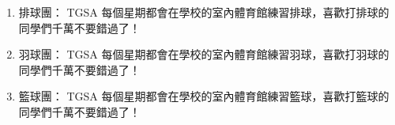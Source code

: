 \documentclass[10pt,a4paper]{book}
\begin{document}
\begin{CJK}{UTF8}{bkai}
\begin{enumerate}
\item{排球團：}
TGSA 每個星期都會在學校的室內體育館練習排球，喜歡打排球的同學們千萬不要錯過了！

\item{羽球團：}
TGSA 每個星期都會在學校的室內體育館練習羽球，喜歡打羽球的同學們千萬不要錯過了！

\item{籃球團：}
TGSA 每個星期都會在學校的室內體育館練習籃球，喜歡打籃球的同學們千萬不要錯過了！

\end{enumerate}

\glsaddall


\backmatter
\newpage
\end{CJK}
\end{document}
